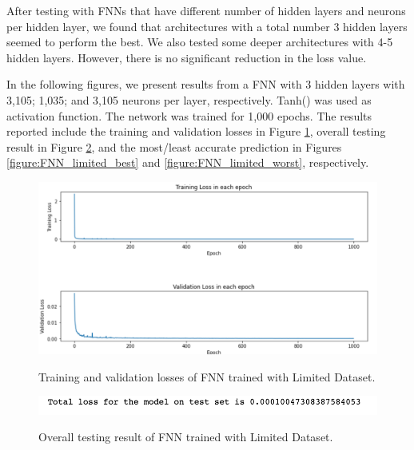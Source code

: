 After testing with FNNs that have different number of hidden layers and neurons per hidden layer, we found that architectures with a total number 3 hidden layers seemed to perform the best. We also tested some deeper architectures with 4-5 hidden layers. However, there is no significant reduction in the loss value.

In the following figures, we present results from a FNN with 3 hidden layers with 3,105; 1,035; and 3,105 neurons per layer, respectively. Tanh() was used as activation function. The network was trained for 1,000 epochs. The results reported include the training and validation losses in Figure \ref{figure:FNN_limited_losses}, overall testing result in Figure \ref{figure:FNN_limited_testing}, and the most/least accurate prediction in Figures \ref{figure:FNN_limited_best} and \ref{figure:FNN_limited_worst}, respectively.

\begin{figure}[H]
    \caption{Training and validation losses of FNN trained with Limited Dataset.}
    \includegraphics[scale=0.6]{figures/mantle_convection_images/limited_dataset/FNN_trainingData.png}
    \label{figure:FNN_limited_losses}
\end{figure}

\begin{figure}[H]
    \caption{Overall testing result of FNN trained with Limited Dataset.}
    \includegraphics[scale=0.8]{figures/mantle_convection_images/limited_dataset/FNN_OverallTesting.png}
    \label{figure:FNN_limited_testing}
\end{figure}

